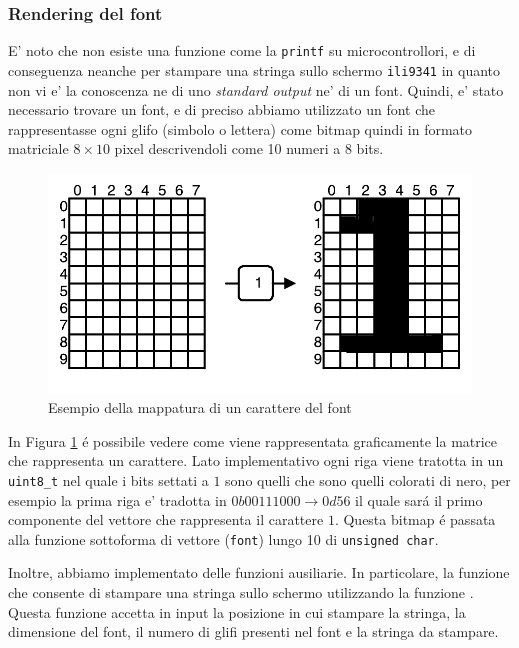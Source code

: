 \documentclass[a4paper]{article}
\begin{document}
\subsubsection{Rendering del font}

E' noto che non esiste una funzione come la \texttt{printf} su microcontrollori, e di conseguenza neanche per stampare una stringa sullo schermo \texttt{ili9341} in quanto non vi e' la conoscenza ne di uno \textit{standard output} ne' di un font. Quindi, e' stato necessario trovare un font, e di preciso abbiamo utilizzato un font che rappresentasse ogni glifo (simbolo o lettera) come bitmap quindi in formato matriciale $8 \times 10$ pixel descrivendoli come 10 numeri a 8 bits.

\begin{figure}[h!t]
    \begin{center}
        \includegraphics[scale=0.5]{./figures/matrix_font.pdf}
    \end{center}
    \caption{Esempio della mappatura di un carattere del font}
    \label{fig:matrix_font}
\end{figure}

In Figura \ref{fig:matrix_font} \'e possibile vedere come viene rappresentata graficamente la matrice che rappresenta un carattere. Lato implementativo ogni riga viene tratotta in un \texttt{uint8\_t} nel quale i bits settati a $1$ sono quelli che sono quelli colorati di nero, per esempio la prima riga e' tradotta in $0b00111000 \rightarrow 0d56$ il quale sar\'a il primo componente del vettore che rappresenta il carattere $1$. Questa bitmap \'e passata alla funzione {} sottoforma di vettore (\texttt{font}) lungo 10 di \texttt{unsigned char}.

Inoltre, abbiamo implementato delle funzioni ausiliarie. In particolare, la funzione {} che consente di stampare una stringa sullo schermo utilizzando la funzione {}. Questa funzione accetta in input la posizione in cui stampare la stringa, la dimensione del font, il numero di glifi presenti nel font e la stringa da stampare.
\end{document}

